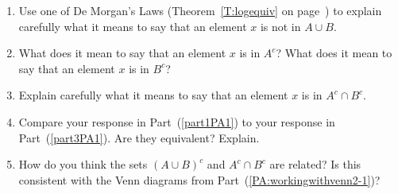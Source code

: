 \begin{previewactivity}
\setcounter{oldenumi}{\theenumi}
\begin{enumerate} \setcounter{enumi}{\theoldenumi}
  \item Use one of De Morgan's Laws (Theorem~\ref{T:logequiv} on page~\pageref{T:logequiv}) to explain carefully what it means to say that an element  $x$  is not in  $A \cup B$. 
\label{part1PA1}
  \item What does it mean to say that an element  $x$  is in  $A^c $? What does it mean to say that an element  $x$  is in  $B^c $? 
  \item Explain carefully what it means to say that an element  $x$   is in  $A^c  \cap B^c $. \label{part3PA1}
  \item Compare your response in Part~(\ref{part1PA1}) to your response in Part~(\ref{part3PA1}).  Are they equivalent?  Explain.
  \item How do you think the sets  $\left( {A \cup B} \right)^c $ and $A^c  \cap B^c $ are related?  Is this consistent with the Venn diagrams from Part~(\ref{PA:workingwithvenn2-1})?
\end{enumerate}
\end{previewactivity}
\hbreak
%



\endinput
